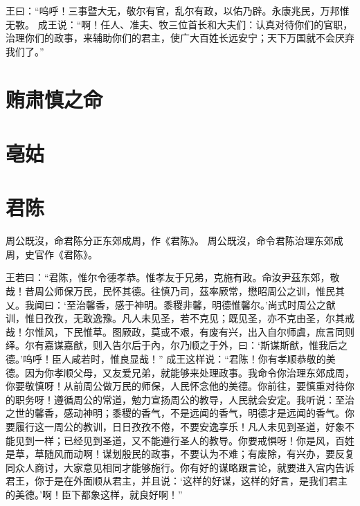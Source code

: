 \documentclass[12pt,UTF8]{ctexbook}
\begin{document}
王曰：“呜呼！三事暨大无，敬尔有官，乱尔有政，以佑乃辟。永康兆民，万邦惟无斁。
成王说：“啊！任人、准夫、牧三位首长和大夫们：认真对待你们的官职，治理你们的政事，来辅助你们的君主，使广大百姓长远安宁；天下万国就不会厌弃我们了。”

\chapter{贿肃慎之命}

\chapter{亳姑}

\chapter{君陈}

周公既沒，命君陈分正东郊成周，作《君陈》。
周公既沒，命令君陈治理东郊成周，史官作《君陈》。

王若曰：“君陈，惟尔令德孝恭。惟孝友于兄弟，克施有政。命汝尹茲东郊，敬哉！昔周公师保万民，民怀其德。往慎乃司，茲率厥常，懋昭周公之训，惟民其乂。我闻曰：‘至治馨香，感于神明。黍稷非馨，明德惟馨尔。’尚式时周公之猷训，惟日孜孜，无敢逸豫。凡人未见圣，若不克见；既见圣，亦不克由圣，尔其戒哉！尔惟风，下民惟草。图厥政，莫或不艰，有废有兴，出入自尔师虞，庶言同则绎。尔有嘉谋嘉猷，则入告尔后于內，尔乃顺之于外，曰：‘斯谋斯猷，惟我后之德。’呜呼！臣人咸若时，惟良显哉！”
成王这样说：“君陈！你有孝顺恭敬的美德。因为你孝顺父母，又友爱兄弟，就能够来处理政事。我命令你治理东郊成周，你要敬慎呀！从前周公做万民的师保，人民怀念他的美德。你前往，要慎重对待你的职务呀！遵循周公的常道，勉力宣扬周公的教导，人民就会安定。我听说：至治之世的馨香，感动神明；黍稷的香气，不是远闻的香气，明德才是远闻的香气。你要履行这一周公的教训，日日孜孜不倦，不要安逸享乐！凡人未见到圣道，好象不能见到一样；已经见到圣道，又不能遵行圣人的教导。你要戒惧呀！你是风，百姓是草，草随风而动啊！谋划殷民的政事，不要认为不难；有废除，有兴办，要反复同众人商讨，大家意见相同才能够施行。你有好的谋略跟言论，就要进入宫内告诉君王，你于是在外面顺从君主，并且说：‘这样的好谋，这样的好言，是我们君主的美德。’啊！臣下都象这样，就良好啊！”
\end{document}
